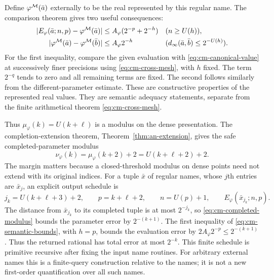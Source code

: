 Define $\varphi^\mathcal M(\bar a)$ externally to be the real represented by
this regular name. The comparison theorem gives two useful consequences:
\begin{equation}
\begin{aligned}
 |E_\varphi(\bar a;n,p)-\varphi^\mathcal M(\bar a)|
   &\leq A_\varphi(2^{-p}+2^{-h})
       &&(n\geq U(h)),\\
 |\varphi^\mathcal M(\bar a)-\varphi^\mathcal M(\bar b)|
   &\leq A_\varphi2^{-h}
       &&(d_\infty(\bar a,\bar b)\leq2^{-U(h)}).
\end{aligned}
\label{eq:cm-semantic-bounds}
\end{equation}
For the first inequality, compare the given evaluation with
\eqref{eq:cm-canonical-value} at successively finer precisions using
\eqref{eq:cm-cross-mesh}, with $h$ fixed. The term $2^{-q}$ tends to
zero and all remaining terms are fixed.
The second follows similarly from the different-parameter estimate.
These are constructive properties of the represented real values.
They are semantic adequacy statements, separate from the finite
arithmetical theorem \eqref{eq:cm-cross-mesh}.

Thus $\mu_\varphi(k)=U(k+\ell)$ is a modulus on the dense presentation.
The completion-extension theorem, Theorem~\ref{thm:an-extension},
gives the safe completed-parameter modulus
\begin{equation}
 \nu_\varphi(k)=\mu_\varphi(k+2)+2=U(k+\ell+2)+2.
 \label{eq:cm-completed-modulus}
\end{equation}
The margin matters because a closed-threshold modulus on dense points
need not extend with its original indices.
For a tuple $\bar x$ of regular names, whose $j$th entries are
$\bar x_j$, an explicit output schedule is
\begin{equation}
 j_k=U(k+\ell+3)+2,\qquad p=k+\ell+2,\qquad n=U(p)+1,
 \qquad E_\varphi(\bar x_{j_k};n,p).
 \label{eq:cm-named-parameters}
\end{equation}
The distance from $\bar x_{j_k}$ to its completed tuple is at most
$2^{-j_k}$, so \eqref{eq:cm-completed-modulus} bounds the parameter
error by $2^{-(k+1)}$. The first inequality of
\eqref{eq:cm-semantic-bounds}, with $h=p$, bounds the evaluation
error by $2A_\varphi2^{-p}\leq2^{-(k+1)}$.
Thus the returned rational has total error at most $2^{-k}$.
This finite schedule is primitive recursive after fixing the input
name routines.
For arbitrary external names this is a finite-query construction
relative to the names; it is not a new first-order quantification over
all such names.

